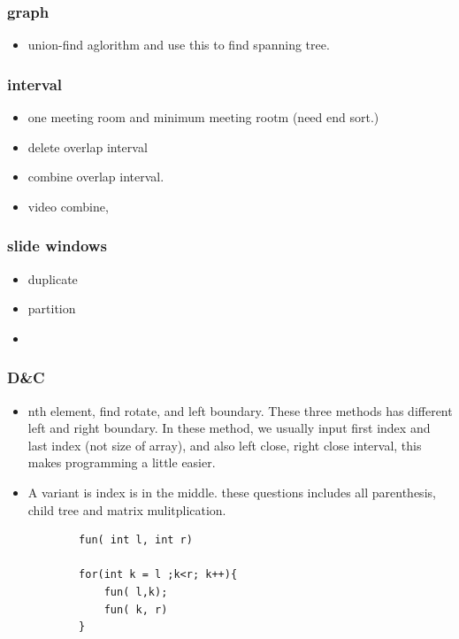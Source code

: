 \documentclass[a4paper,11pt,twoside]{book}
\begin{document}
\subsubsection{graph}

\begin{itemize}
	\item union-find aglorithm and use this to find spanning tree.
	
\end{itemize}

\subsubsection{interval}
\begin{itemize}
	\item one meeting room and minimum meeting rootm (need end sort.)
	\item delete overlap interval
	\item combine overlap interval.
	\item video combine, 
	
\end{itemize}

\subsubsection{slide windows}
\begin{itemize}
	\item duplicate
	\item partition
	\item 
\end{itemize}

\subsubsection{D\&C}
\begin{itemize}
	\item nth element, find rotate, and left boundary. These three methods has different left and right boundary.  In these method, we usually input first index and last index (not size of array), and also left close, right close interval, this makes programming a little easier. 
	
	\item A variant is index is in the middle. these questions includes all parenthesis, child tree and matrix mulitplication.
	\begin{lstlisting}
		fun( int l, int r)
		
		for(int k = l ;k<r; k++){
			fun( l,k);
			fun( k, r)
		}	
		
	\end{lstlisting}
\end{itemize}
\end{document}
